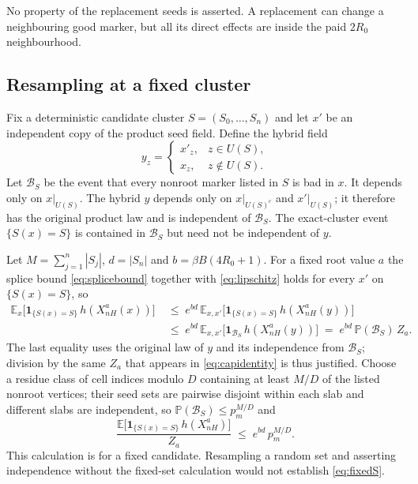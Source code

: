 \documentclass[11pt]{article}
\theoremstyle{plain}
\theoremstyle{definition}
\theoremstyle{remark}
\newcommand{\E}{\mathbb{E}}
\newcommand{\Prob}{\mathbb{P}}
\begin{document}
No property of the replacement seeds is asserted. A replacement can change a neighbouring good marker, but all its direct effects are inside the paid $2R_0$ neighbourhood.

\subsection{Resampling at a fixed cluster}
\label{sec:resample}

Fix a deterministic candidate cluster $S=(S_0,\dots,S_n)$ and let $x'$ be an independent copy of the product seed field. Define the hybrid field
\begin{equation}
y_z=\begin{cases}x'_z,& z\in U(S),\\ x_z,& z\notin U(S).\end{cases}
\label{eq:hybrid}
\end{equation}
Let $\mathcal B_S$ be the event that every nonroot marker listed in $S$ is bad in $x$. It depends only on $x|_{U(S)}$. The hybrid $y$ depends only on $x|_{U(S)^c}$ and $x'|_{U(S)}$; it therefore has the original product law and is independent of $\mathcal B_S$. The exact-cluster event $\{S(x)=S\}$ is contained in $\mathcal B_S$ but need not be independent of $y$.

Let $M=\sum_{j=1}^n|S_j|$, $d=|S_n|$ and $b=\beta B(4R_0+1)$. For a fixed root value $a$ the splice bound \eqref{eq:splicebound} together with \eqref{eq:lipschitz} holds for every $x'$ on $\{S(x)=S\}$, so
\begin{equation}
\begin{aligned}
\E_x\bigl[\mathbf 1_{\{S(x)=S\}}\,h(X^a_{nH}(x))\bigr]
&\;\le\;e^{bd}\,\E_{x,x'}\bigl[\mathbf 1_{\{S(x)=S\}}\,h(X^a_{nH}(y))\bigr]\\
&\;\le\;e^{bd}\,\E_{x,x'}\bigl[\mathbf 1_{\mathcal B_S}\,h(X^a_{nH}(y))\bigr]
\;=\;e^{bd}\,\Prob(\mathcal B_S)\,Z_a.
\end{aligned}
\label{eq:resample}
\end{equation}
The last equality uses the original law of $y$ and its independence from $\mathcal B_S$; division by the same $Z_a$ that appears in \eqref{eq:capidentity} is thus justified. Choose a residue class of cell indices modulo $D$ containing at least $M/D$ of the listed nonroot vertices; their seed sets are pairwise disjoint within each slab and different slabs are independent, so $\Prob(\mathcal B_S)\le p_m^{M/D}$ and
\begin{equation}
\frac{\E\bigl[\mathbf 1_{\{S(x)=S\}}\,h(X^a_{nH})\bigr]}{Z_a}\;\le\;e^{bd}\,p_m^{M/D}.
\label{eq:fixedS}
\end{equation}
This calculation is for a fixed candidate. Resampling a random set and asserting independence without the fixed-set calculation would not establish \eqref{eq:fixedS}.
\end{document}
